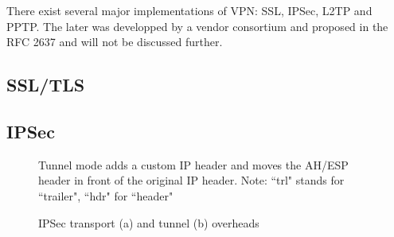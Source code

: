 
There exist several major implementations of VPN: SSL, IPSec, L2TP and PPTP.
The later was developped by a vendor consortium and proposed in the RFC 2637 and will not be discussed further.

\subsection{SSL/TLS}

\subsection{IPSec}


\begin{figure}[ht]
\center
{}
\caption{IPSec transport (a) and tunnel (b) overheads}{Tunnel mode adds a custom IP header and moves the AH/ESP header in front of the original IP header. Note: ``trl" stands for ``trailer", ``hdr" for ``header"}
\label{fig:ipsec-transport-tunnel}
\end{figure}